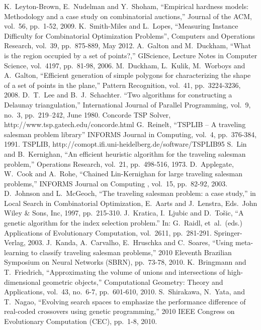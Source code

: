 \documentclass[conference]{IEEEtran}
\begin{document}
\begin{thebibliography}{99}
K.~Leyton-Brown, E.~Nudelman and Y.~Shoham, ``Empirical hardness models: Methodology and a case study on combinatorial auctions,'' Journal of the ACM, vol.~56, pp.~1-52, 2009.
K.~Smith-Miles and L.~Lopes, ``Measuring Instance Difficulty for Combinatorial Optimization Problems'', Computers and Operations Research, vol.~39, pp.~875-889, May 2012.
A.~Galton and M.~Duckham, ``What is the region occupied by a set of points?,'' GIScience, Lecture Notes in Computer Science, vol.~4197, pp.~81-98, 2006.
M.~Duckham, L.~Kulik, M.~Worboys and A.~Galton, ``Efficient generation of simple polygons for characterizing the shape of a set of points in the plane,'' Pattern Recognition, vol.~41, pp.~3224-3236, 2008.
D.~T.~Lee and B.~J.~Schachter. ``Two algorithms for constructing a Delaunay triangulation,'' International Journal of Parallel Programming, vol.~9, no.~3, pp.~219–242, June 1980.
Concorde TSP Solver, http://www.tsp.gatech.edu/concorde.html
G.~Reinelt, ``TSPLIB -- A traveling salesman problem library'' INFORMS Journal in Computing, vol.~4, pp.~376-384, 1991.
TSPLIB, http://comopt.ifi.uni-heidelberg.de/software/TSPLIB95
S.~Lin and B.~Kernighan, ``An efficient heuristic algorithm for the traveling salesman problem,'' Operations Research, vol.~21, pp.~498-516, 1973.
D.~Applegate, W.~Cook and A.~Rohe, ``Chained Lin-Kernighan for large traveling salesman problems,'' INFORMS Journal on Computing , vol.~15, pp.~82-92, 2003.
D.~Johnson and L.~McGeoch, ``The traveling salesman problem: a case study,'' in Local Search in Combinatorial Optimization, E.~Aarts and J.~Lenstra, Eds.~John Wiley \& Sons, Inc, 1997, pp.~215-310.
J.~Kratica, I.~Ljubic and D.~Tošic, ``A genetic algorithm for the index selection problem.'' In: G.~Raidl, et~al.~(eds.) Applications of Evolutionary Computation, vol.~2611, pp.~281-291. Springer-Verlag, 2003.
J.~Kanda, A.~Carvalho, E.~Hruschka and C.~Soares, ``Using meta-learning to classify traveling salesman problems,'' 2010 Eleventh Brazilian Symposium on Neural Networks (SBRN), pp.~73-78, 2010.
K.~Bringmann and T.~Friedrich, ``Approximating the volume of unions and intersections of high-dimensional geometric objects,'' Computational Geometry: Theory and Applications, vol.~43, no.~6-7, pp.~601-610, 2010.
S.~Shirakawa, N.~Yata, and T.~Nagao, ``Evolving search spaces to emphasize the performance difference of real-coded crossovers using genetic programming,'' 2010 IEEE Congress on Evolutionary Computation (CEC), pp.~1-8, 2010.
\end{thebibliography}
\end{document}
